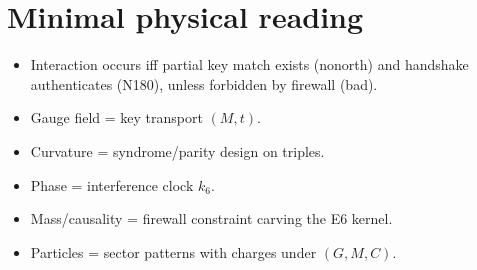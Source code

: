 \documentclass[11pt]{article}
\begin{document}
\section*{Minimal physical reading}
\begin{itemize}
  \item Interaction occurs iff partial key match exists (nonorth) and handshake authenticates (N180), unless forbidden by firewall (bad).
  \item Gauge field = key transport $(M,t)$.
  \item Curvature = syndrome/parity design on triples.
  \item Phase = interference clock $k_6$.
  \item Mass/causality = firewall constraint carving the E6 kernel.
  \item Particles = sector patterns with charges under $(G,M,C)$.
\end{itemize}
\end{document}
